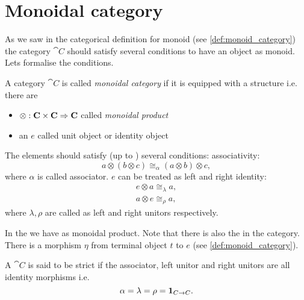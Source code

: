 \section{Monoidal category}
As we saw in the categorical definition for monoid (see
\cref{def:monoid_category}) the category $\cat{C}$ should satisfy
several conditions to have an object as monoid. Lets formalise the conditions.
\begin{definition}
\label{def:monoidal_category}
A category $\cat{C}$ is called \textit{monoidal category} if it is
equipped with a  structure i.e. there are
\begin{itemize}
\item {} $\otimes: \mathbf{C} \times \mathbf{C} \Rightarrow
  \mathbf{C}$ called \textit{monoidal product}  
\item an  $e$ called unit object or identity object
\end{itemize}

The elements should satisfy (up to ) several conditions:
associativity: 
\begin{equation}
a \otimes \left( b \otimes c \right) \cong_\alpha
  \left( a \otimes b \right) \otimes c,
\nonumber
\end{equation}
where $\alpha$ is called associator. 
$e$ can be treated as left and right identity: 
\begin{eqnarray}
e \otimes a \cong_\lambda a, 
\nonumber \\
a \otimes e \cong_\rho a,
\nonumber
\end{eqnarray}
where $\lambda, \rho$ are called as left and right unitors respectively.  
\end{definition}

In the  we have
 as monoidal product. Note that there
is also the  in the category. There is a
morphism $\eta$ from terminal object $t$ to $e$
\cite{bib:stackexchange:terminalinmonoid} (see \cref{def:monoid_category}). 

\begin{definition}
\label{def:strict_monoidal_category}
A  $\cat{C}$ is said to be strict if the
associator, left 
unitor and right unitors are all identity morphisms i.e.
\[
\alpha = \lambda = \rho = \mathbf{1}_{ C \to C }.
\]
 
\end{definition}

